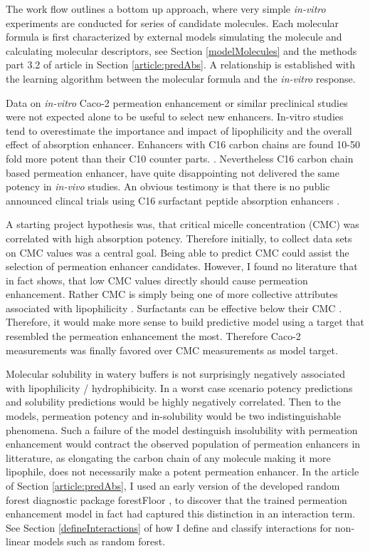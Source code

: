 The work flow outlines a bottom up approach, where very simple \textit{in-vitro} experiments are conducted for series of candidate molecules. Each molecular formula is first characterized by external models simulating the molecule and calculating molecular descriptors, see Section \ref{modelMolecules} and the methods part 3.2 of article in Section \ref{article:predAbs}. A relationship is established with the learning algorithm between the molecular formula and the \textit{in-vitro} response.

Data on \textit{in-vitro} Caco-2 permeation enhancement or similar preclinical studies were not expected alone to be useful to select new enhancers. In-vitro studies tend to overestimate the importance and impact of lipophilicity and the overall effect of absorption enhancer. Enhancers with C16 carbon chains are found 10-50 fold more potent than their C10 counter parts. \cite{maher2009safety,tippin2008biorelevant}. Nevertheless C16 carbon chain based permeation enhancer, have quite disappointing not delivered the same potency in \textit{in-vivo} studies. An obvious testimony is that there is no public announced clincal trials using C16 surfactant peptide absorption enhancers \cite{aguirre2016current}.

A starting project hypothesis was, that critical micelle concentration (CMC) was correlated with high absorption potency. Therefore initially, to collect data sets on CMC values was a central goal. Being able to predict CMC could assist the selection of permeation enhancer candidates. However, I found no literature that in fact shows, that low CMC values directly should cause permeation enhancement. Rather CMC is simply being one of more collective attributes associated with lipophilicity \cite{rosen2012surfactants}. Surfactants can be effective below their CMC \cite{xia2000mechanistic}. Therefore, it would make more sense to build predictive model using a target that resembled the permeation enhancement the most. Therefore Caco-2 measurements was finally favored over CMC measurements as model target.

Molecular solubility in watery buffers is not surprisingly negatively associated with lipophilicity / hydrophibicity. In a worst case scenario potency predictions and solubility predictions would be highly negatively correlated. Then to the models, permeation potency and in-solubility would be two indistinguishable phenomena. Such a failure of the model destinguish insolubility with permeation enhancement would contract the observed population of permeation enhancers in litterature, as elongating the carbon chain of any molecule making it more lipophile, does not necessarily make a potent permeation enhancer. In the article of Section \ref{article:predAbs}, I used an early version of the developed random forest diagnostic package forestFloor \cite{welling2016forest}, to discover that the trained permeation enhancement model in fact had captured this distinction in an interaction term. See Section \ref{defineInteractions} of how I define and classify interactions for non-linear models such as random forest.

